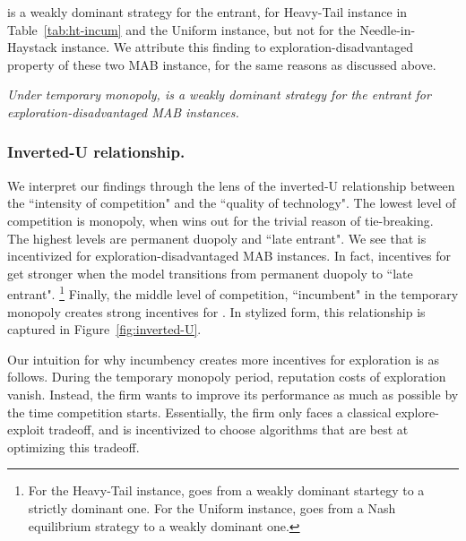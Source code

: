 \documentclass[../competing_bandits_with_appendix.tex]{subfiles}
\begin{document}
\DG is a weakly dominant strategy for the entrant, for Heavy-Tail instance in Table~\ref{tab:ht-incum} and the Uniform instance, but not for the Needle-in-Haystack instance. We attribute this finding to exploration-disadvantaged property of these two MAB instance, for the same reasons as discussed above.

\begin{finding}\label{find:temp-monopoly-entrant}
\textit{Under temporary monopoly, \DG is a weakly dominant strategy for the entrant for exploration-disadvantaged MAB instances.
}
\end{finding}

\subsubsection{Inverted-U relationship.}
We interpret our findings through the lens of the inverted-U relationship between the ``intensity of competition" and the ``quality of technology". The lowest level of competition is monopoly, when \DG wins out for the trivial reason of tie-breaking. The highest levels are permanent duopoly and ``late entrant". We see that \DG is incentivized for exploration-disadvantaged MAB instances. In fact, incentives for \DG get stronger when the model transitions from permanent duopoly to ``late entrant".%
\footnote{For the Heavy-Tail instance, \DG goes from a weakly dominant startegy to a strictly dominant one. For the Uniform instance, \DG goes from a Nash equilibrium strategy to a weakly dominant one.}
Finally, the middle level of competition, ``incumbent" in the temporary monopoly creates strong incentives for \TS. In stylized form, this relationship is captured in Figure~\ref{fig:inverted-U}.


Our intuition for why incumbency creates more incentives for exploration is as follows. During the temporary monopoly period, reputation costs of exploration vanish. Instead, the firm wants to improve its performance as much as possible by the time competition starts. Essentially, the firm only faces a classical explore-exploit tradeoff, and is incentivized to choose algorithms that are best at optimizing this tradeoff.
\end{document}
